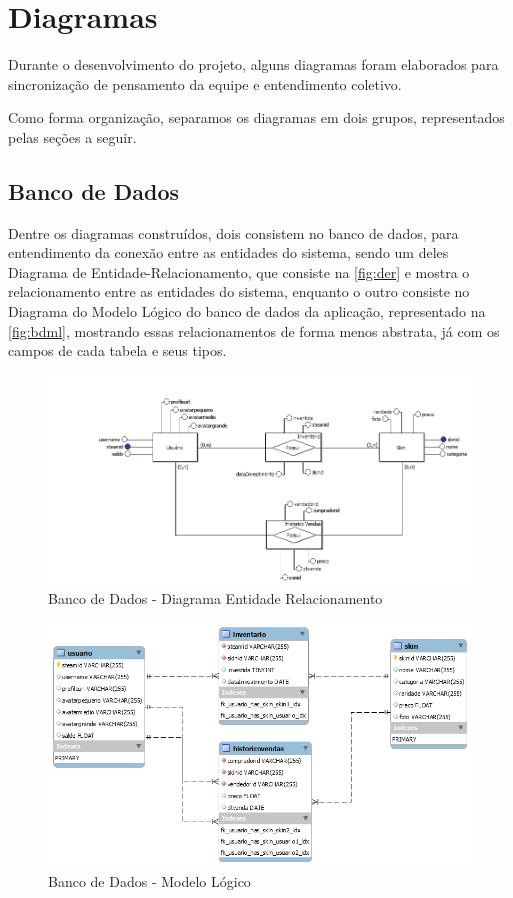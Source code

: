 \chapter[Diagramas]{Diagramas}
Durante o desenvolvimento do projeto, alguns diagramas foram elaborados para sincronização de pensamento da equipe e entendimento coletivo.

Como forma organização, separamos os diagramas em dois grupos, representados pelas seções a seguir.

 \section{Banco de Dados}
  Dentre os diagramas construídos, dois consistem no banco de dados, para entendimento da conexão entre as entidades do sistema, sendo um deles Diagrama de Entidade-Relacionamento, que consiste na \autoref{fig:der} e mostra o relacionamento entre as entidades do sistema, enquanto o outro consiste no Diagrama do Modelo Lógico do banco de dados da aplicação, representado na \autoref{fig:bdml}, mostrando essas relacionamentos de forma menos abstrata, já com os campos de cada tabela e seus tipos.

  \begin{figure}[!htb]
        \centering
        \includegraphics[scale=0.5]{Imagens/Relacionamento.png}
        \caption{Banco de Dados - Diagrama Entidade Relacionamento}
        \label{fig:der}
 \end{figure}

\begin{figure}[!htb]
	\centering
	\includegraphics[scale=0.6]{Imagens/Logico.png}
	\caption{Banco de Dados - Modelo Lógico}
	\label{fig:bdml}
\end{figure}
\clearpage

